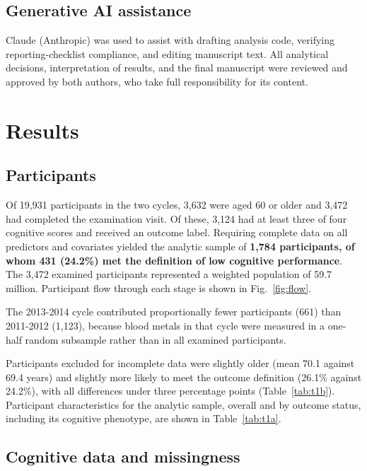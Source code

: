 \documentclass[12pt]{article}
\begin{document}
\subsection*{Generative AI assistance}

Claude (Anthropic) was used to assist with drafting analysis code, verifying reporting-checklist compliance, and editing manuscript text. All analytical decisions, interpretation of results, and the final manuscript were reviewed and approved by both authors, who take full responsibility for its content.

\section*{Results}

\subsection*{Participants}

Of 19,931 participants in the two cycles, 3,632 were aged 60 or older and 3,472 had completed the examination visit. Of these, 3,124 had at least three of four cognitive scores and received an outcome label. Requiring complete data on all predictors and covariates yielded the analytic sample of \textbf{1,784 participants, of whom 431 (24.2\%) met the definition of low cognitive performance}. The 3,472 examined participants represented a weighted population of 59.7 million. Participant flow through each stage is shown in Fig.~\ref{fig:flow}.

The 2013-2014 cycle contributed proportionally fewer participants (661) than 2011-2012 (1,123), because blood metals in that cycle were measured in a one-half random subsample rather than in all examined participants.

Participants excluded for incomplete data were slightly older (mean 70.1 against 69.4 years) and slightly more likely to meet the outcome definition (26.1\% against 24.2\%), with all differences under three percentage points (Table~\ref{tab:t1b}). Participant characteristics for the analytic sample, overall and by outcome status, including its cognitive phenotype, are shown in Table~\ref{tab:t1a}.

\subsection*{Cognitive data and missingness}
\end{document}
